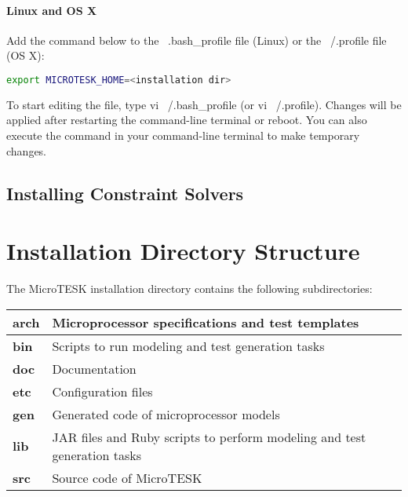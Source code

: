 \documentclass[oneside,final,14pt]{extreport}
\begin{document}
\paragraph{Linux and OS X}

Add the command below to the ~.bash{\_}profile file (Linux) or the ~/.profile
file (OS X):

\begin{lstlisting}[language=bash]
export MICROTESK_HOME=<installation dir>
\end{lstlisting}

To start editing the file, type vi ~/.bash{\_}profile (or vi ~/.profile). Changes
will be applied after restarting the command-line terminal or reboot. You can also
execute the command in your command-line terminal to make temporary changes.

\subsection{Installing Constraint Solvers}

\section{Installation Directory Structure}

The MicroTESK installation directory contains the following subdirectories:

\begin{tabular}{ | l | p{12.5cm} |}
  \hline
  \textbf{arch} & Microprocessor specifications and test templates \\ \hline
  \textbf{bin}  & Scripts to run modeling and test generation tasks \\ \hline
  \textbf{doc}  & Documentation \\ \hline
  \textbf{etc}  & Configuration files \\ \hline
  \textbf{gen}  & Generated code of microprocessor models \\ \hline
  \textbf{lib}  & JAR files and Ruby scripts to perform modeling and test generation 
                  tasks \\ \hline
  \textbf{src}  & Source code of MicroTESK \\ \hline
\end{tabular}

\end{document}
